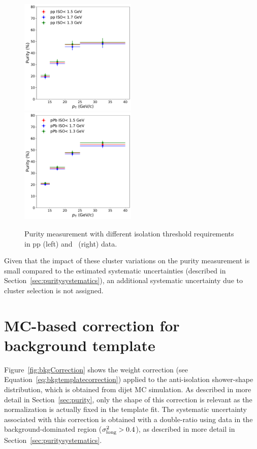 \begin{figure}
	\center
	\includegraphics[width=0.495\textwidth]{Checks_Systematics/ppiso.pdf}
	\includegraphics[width=0.495\textwidth]{Checks_Systematics/ppbiso.pdf}
	\caption{Purity measurement with different isolation threshold requirements in pp (left) and \pPb~(right) data.}
	\label{fig:isolationvariation}
\end{figure}




Given that the impact of these cluster variations on the purity measurement is small compared to the estimated systematic uncertainties (described in Section~\ref{sec:puritysystematics}), an additional systematic uncertainty due to cluster selection is not assigned. 

\section{MC-based correction for background template}
\label{sec:MCbasedcorrection}

Figure~\ref{fig:bkgCorrection} shows the weight correction (see Equation~\ref{eq:bkgtemplatecorrection}) applied to the anti-isolation shower-shape distribution, which is obtained from dijet MC simulation. As described in more detail in Section~\ref{sec:purity}, only the shape of this correction is relevant as the normalization is actually fixed in the template fit. The systematic uncertainty associated with this correction is obtained with a double-ratio using data in the background-dominated region ($\sigma^{2}_{\mathrm{long}}>0.4$), as described in more detail in Section~\ref{sec:puritysystematics}. 

